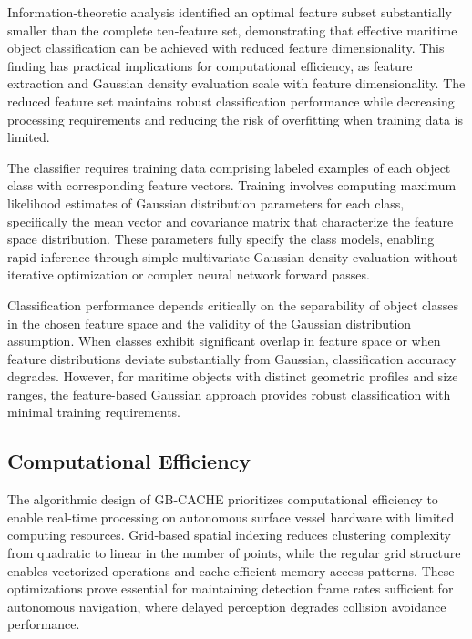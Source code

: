 \documentclass[../main.tex]{subfiles}
\begin{document}
Information-theoretic analysis identified an optimal feature subset substantially smaller than the complete ten-feature set, demonstrating that effective maritime object classification can be achieved with reduced feature dimensionality.
This finding has practical implications for computational efficiency, as feature extraction and Gaussian density evaluation scale with feature dimensionality.
The reduced feature set maintains robust classification performance while decreasing processing requirements and reducing the risk of overfitting when training data is limited.

The classifier requires training data comprising labeled examples of each object class with corresponding feature vectors.
Training involves computing maximum likelihood estimates of Gaussian distribution parameters for each class, specifically the mean vector and covariance matrix that characterize the feature space distribution.
These parameters fully specify the class models, enabling rapid inference through simple multivariate Gaussian density evaluation without iterative optimization or complex neural network forward passes.

Classification performance depends critically on the separability of object classes in the chosen feature space and the validity of the Gaussian distribution assumption.
When classes exhibit significant overlap in feature space or when feature distributions deviate substantially from Gaussian, classification accuracy degrades.
However, for maritime objects with distinct geometric profiles and size ranges, the feature-based Gaussian approach provides robust classification with minimal training requirements.


\subsection{Computational Efficiency} \label{sec:gbcache_efficiency}

The algorithmic design of \ac{GB-CACHE} prioritizes computational efficiency to enable real-time processing on autonomous surface vessel hardware with limited computing resources.
Grid-based spatial indexing reduces clustering complexity from quadratic to linear in the number of points, while the regular grid structure enables vectorized operations and cache-efficient memory access patterns.
These optimizations prove essential for maintaining detection frame rates sufficient for autonomous navigation, where delayed perception degrades collision avoidance performance.
\end{document}
